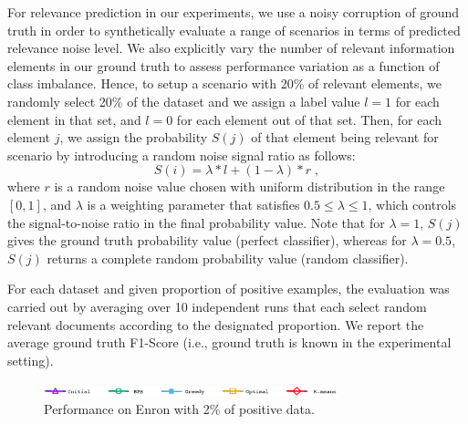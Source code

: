 For relevance prediction in our experiments, we use a noisy corruption of ground truth in order to synthetically evaluate a range of scenarios in terms of predicted relevance noise level.
We also explicitly vary the number of relevant information elements in our ground truth to assess performance variation as a function of class imbalance.  Hence, to setup a scenario with 20\% of relevant elements, we randomly select 20\% of the dataset and we assign a label value $l=1$ for each element in that set, and $l=0$ for each element out of that set. Then, for each element $j$, we assign the probability $S(j)$ of that element being relevant for scenario by introducing a random noise signal ratio as follows:
\begin{equation}
S(i) = \lambda*l+(1-\lambda)*r \; ,
\end{equation}
where $r$ is a random noise value chosen with uniform distribution in the range $[0,1]$, and $\lambda$ is a weighting parameter  that satisfies $0.5 \leq \lambda \leq 1$, which controls the signal-to-noise ratio in the final probability value. Note that for $\lambda=1$, $S(j)$ gives the ground truth probability value (perfect classifier), whereas for $\lambda=0.5$, $S(j)$ returns a complete random probability value (random classifier).


For each dataset and given proportion of positive examples, the evaluation was carried out by averaging over 10 independent runs that each select random relevant documents according to the designated proportion.  We report the average ground truth F1-Score (i.e., ground truth is known in the experimental setting).


\begin{figure}[H]
\begin{centering}
\includegraphics[width=8.5cm]{imgs/legend1}
\par\end{centering}
\begin{centering}
\par\end{centering}
\caption{Performance on  Enron  with 2\% of positive data.}
\label{fig:F1_vs_Data_Enron}
\end{figure}

